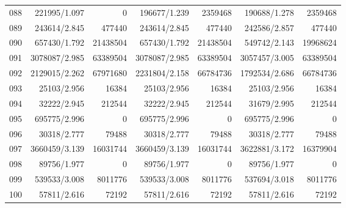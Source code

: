 \begin{longtable}{crrrrrr}
088 & 221995/1.097 & 0 & 196677/1.239 & 2359468 & 190688/1.278 & 2359468 \\
089 & 243614/2.845 & 477440 & 243614/2.845 & 477440 & 242586/2.857 & 477440 \\
090 & 657430/1.792 & 21438504 & 657430/1.792 & 21438504 & 549742/2.143 & 19968624 \\
091 & 3078087/2.985 & 63389504 & 3078087/2.985 & 63389504 & 3057457/3.005 & 63389504 \\
092 & 2129015/2.262 & 67971680 & 2231804/2.158 & 66784736 & 1792534/2.686 & 66784736 \\
093 & 25103/2.956 & 16384 & 25103/2.956 & 16384 & 25103/2.956 & 16384 \\
094 & 32222/2.945 & 212544 & 32222/2.945 & 212544 & 31679/2.995 & 212544 \\
095 & 695775/2.996 & 0 & 695775/2.996 & 0 & 695775/2.996 & 0 \\
096 & 30318/2.777 & 79488 & 30318/2.777 & 79488 & 30318/2.777 & 79488 \\
097 & 3660459/3.139 & 16031744 & 3660459/3.139 & 16031744 & 3622881/3.172 & 16379904 \\
098 & 89756/1.977 & 0 & 89756/1.977 & 0 & 89756/1.977 & 0 \\
099 & 539533/3.008 & 8011776 & 539533/3.008 & 8011776 & 537694/3.018 & 8011776 \\
100 & 57811/2.616 & 72192 & 57811/2.616 & 72192 & 57811/2.616 & 72192 \\
\end{longtable}

